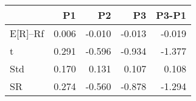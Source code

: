 \begin{tabular}{lrrrr}
\toprule
 & P1 & P2 & P3 & P3-P1 \\
\midrule
E[R]--Rf & 0.006 & -0.010 & -0.013 & -0.019 \\
t & 0.291 & -0.596 & -0.934 & -1.377 \\
Std & 0.170 & 0.131 & 0.107 & 0.108 \\
SR & 0.274 & -0.560 & -0.878 & -1.294 \\
\bottomrule
\end{tabular}
